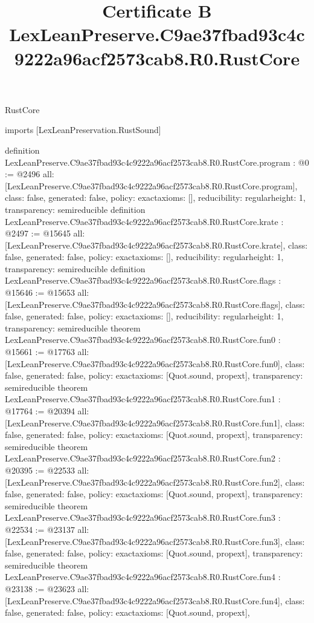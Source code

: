 \begin{lexlean}{RustCore}
\title{Certificate B LexLeanPreserve.C9ae37fbad93c4c9222a96acf2573cab8.R0.RustCore}
\begin{coremodule}
imports [LexLeanPreservation.RustSound]

definition LexLeanPreserve.C9ae37fbad93c4c9222a96acf2573cab8.R0.RustCore.program : @0 := @2496 {
  all: [LexLeanPreserve.C9ae37fbad93c4c9222a96acf2573cab8.R0.RustCore.program],
  class: false,
  generated: false,
  policy: exact{axioms: []},
  reducibility: regular{height: 1},
  transparency: semireducible
}
definition LexLeanPreserve.C9ae37fbad93c4c9222a96acf2573cab8.R0.RustCore.krate : @2497 := @15645 {
  all: [LexLeanPreserve.C9ae37fbad93c4c9222a96acf2573cab8.R0.RustCore.krate],
  class: false,
  generated: false,
  policy: exact{axioms: []},
  reducibility: regular{height: 1},
  transparency: semireducible
}
definition LexLeanPreserve.C9ae37fbad93c4c9222a96acf2573cab8.R0.RustCore.flags : @15646 := @15653 {
  all: [LexLeanPreserve.C9ae37fbad93c4c9222a96acf2573cab8.R0.RustCore.flags],
  class: false,
  generated: false,
  policy: exact{axioms: []},
  reducibility: regular{height: 1},
  transparency: semireducible
}
theorem LexLeanPreserve.C9ae37fbad93c4c9222a96acf2573cab8.R0.RustCore.fun0 : @15661 := @17763 {
  all: [LexLeanPreserve.C9ae37fbad93c4c9222a96acf2573cab8.R0.RustCore.fun0],
  class: false,
  generated: false,
  policy: exact{axioms: [Quot.sound, propext]},
  transparency: semireducible
}
theorem LexLeanPreserve.C9ae37fbad93c4c9222a96acf2573cab8.R0.RustCore.fun1 : @17764 := @20394 {
  all: [LexLeanPreserve.C9ae37fbad93c4c9222a96acf2573cab8.R0.RustCore.fun1],
  class: false,
  generated: false,
  policy: exact{axioms: [Quot.sound, propext]},
  transparency: semireducible
}
theorem LexLeanPreserve.C9ae37fbad93c4c9222a96acf2573cab8.R0.RustCore.fun2 : @20395 := @22533 {
  all: [LexLeanPreserve.C9ae37fbad93c4c9222a96acf2573cab8.R0.RustCore.fun2],
  class: false,
  generated: false,
  policy: exact{axioms: [Quot.sound, propext]},
  transparency: semireducible
}
theorem LexLeanPreserve.C9ae37fbad93c4c9222a96acf2573cab8.R0.RustCore.fun3 : @22534 := @23137 {
  all: [LexLeanPreserve.C9ae37fbad93c4c9222a96acf2573cab8.R0.RustCore.fun3],
  class: false,
  generated: false,
  policy: exact{axioms: [Quot.sound, propext]},
  transparency: semireducible
}
theorem LexLeanPreserve.C9ae37fbad93c4c9222a96acf2573cab8.R0.RustCore.fun4 : @23138 := @23623 {
  all: [LexLeanPreserve.C9ae37fbad93c4c9222a96acf2573cab8.R0.RustCore.fun4],
  class: false,
  generated: false,
  policy: exact{axioms: [Quot.sound, propext]},
}
\end{coremodule}
\end{lexlean}
